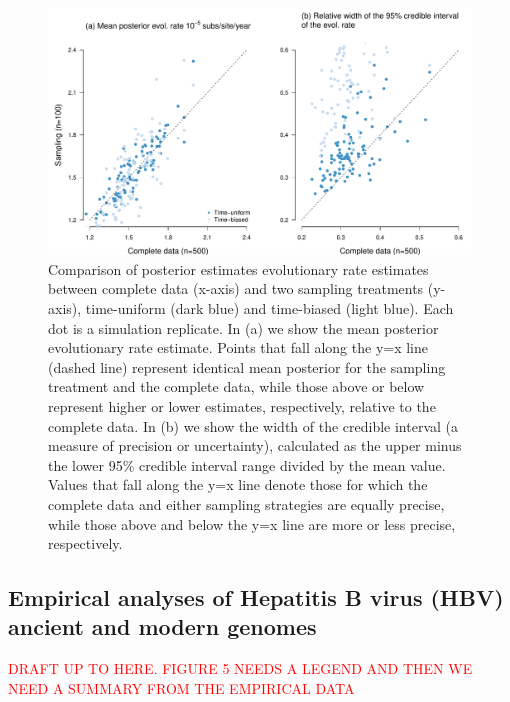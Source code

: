 \documentclass[11pt]{article}
\begin{document}
\begin{figure}[H]
	\begin{center}
		\includegraphics[scale=0.5, angle=0]{sampling_bias_summary_rates.pdf}
		\caption{Comparison of posterior estimates evolutionary rate estimates between complete data (x-axis) and two sampling treatments (y-axis), time-uniform (dark blue) and time-biased (light blue). Each dot is a simulation replicate. In (a) we show the mean posterior evolutionary rate estimate. Points that fall along the y=x line (dashed line) represent identical mean posterior for the sampling treatment and the complete data, while those above or below represent higher or lower estimates, respectively, relative to the complete data. In (b) we show the width of the credible interval (a measure of precision or uncertainty), calculated as the upper minus the lower 95\% credible interval range divided by the mean value. Values that fall along the y=x line denote those for which the complete data and either sampling strategies are equally precise, while those above and below the y=x line are more or less precise, respectively.}
		\label{figure:Fig5}
	\end{center}
\end{figure}

\subsection{Empirical analyses of Hepatitis B virus (HBV) ancient and modern genomes}

\textcolor{red}{DRAFT UP TO HERE. FIGURE 5 NEEDS A LEGEND AND THEN WE NEED A SUMMARY FROM THE EMPIRICAL DATA}
\end{document}
